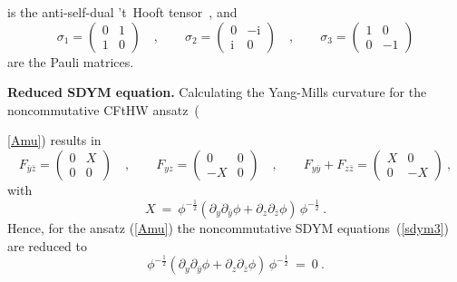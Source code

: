 \documentclass[a4paper,11pt]{article}
\numberwithin{equation}{section}
\def\s{\sigma}
\def\i{\mbox{i}}
\def\pa{\mbox{$\partial$}}
\begin{document}
is the anti-self-dual 't~Hooft tensor~\cite{Prasad:1980yy}, and 
\begin{equation}
\s_1=\begin{pmatrix}0&1\\1&0\end{pmatrix}\quad ,\qquad
\s_2=\begin{pmatrix}0&-\i\\\i&0\end{pmatrix}\quad ,\qquad
\s_3=\begin{pmatrix}1&0\\0&-1\end{pmatrix}
\end{equation}
are the Pauli matrices.

\noindent
{\bf Reduced SDYM equation.} 
Calculating the Yang-Mills curvature for the 
noncommutative CFtHW ansatz~({\ref{Amu}) results in
\begin{equation}\label{csdym}
{}F_{\bar y\bar z}=\begin{pmatrix}0&X\\ 0&0\end{pmatrix}\quad,\qquad
{}F_{yz}          =\begin{pmatrix}0&0\\-X&0\end{pmatrix}\quad,\qquad
{}F_{ y\bar y}+F_{z\bar z}=\begin{pmatrix}X&0\\0&-X\end{pmatrix}\ ,
\end{equation}
with
\begin{equation}
X\ =\ \phi^{-\frac12} 
(\pa_y\pa_{\bar y}\phi + \pa_z\pa_{\bar z}\phi )\,\phi^{-\frac12}\ .
\end{equation}
Hence, for the ansatz (\ref{Amu}) the noncommutative SDYM 
equations~(\ref{sdym3}) are reduced to 
\begin{equation}\label{redop}
\phi^{-\frac12}
(\pa_y\pa_{\bar y}\phi + \pa_z\pa_{\bar z}\phi )\,\phi^{-\frac12}\ =\ 0\ .
\end{equation}

}
\end{document}
